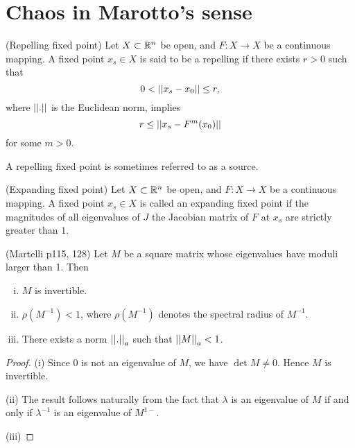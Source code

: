 \documentclass[12pt,draft,twoside]{book}
\begin{document}
\section{Chaos in Marotto's sense}
\citep{marotto1,marotto2} 

\begin{definition}
  (Repelling fixed point)
  Let $X \subset \mathbb{R}^n$ be open, and $F: X \to X$ be a continuous mapping. 
  A fixed point $x_s \in X$ is said to be a repelling if there exists $r > 0$
  such that 
  \begin{equation*}
    0 < \left|\left| x_s - x_0 \right|\right| \leq r,
  \end{equation*}
  where $\left|\left| . \right|\right|$ is the Euclidean norm, implies
\begin{equation*}
  r \leq \left|\left| x_s - F^m(x_0) \right|\right|
\end{equation*}
for some $m > 0$.
\end{definition}
A repelling fixed point is sometimes referred to as a source.

\begin{definition}
  (Expanding fixed point)
  Let $X \subset \mathbb{R}^n$ be open, and $F: X \to X$ be a continuous mapping. 
  A fixed point $x_s \in  X$ is called an expanding fixed point if
  the magnitudes of all eigenvalues of $J$ the Jacobian matrix of $F$ at $x_s$ are strictly greater than $1$.
\end{definition}

\begin{lemma}
  (Martelli p115, 128)
  Let $M$ be a square matrix whose eigenvalues have moduli larger than 1.
  Then 
  \begin{enumerate}[(i)]
    \item $M$ is invertible.
    \item $\rho(M^{-1}) < 1$, where $\rho(M^{-1})$ denotes the spectral radius of $M^{-1}$.
    \item There exists a norm $\left|\left| . \right|\right|_a$ such that $\left|\left| M \right|\right|_a < 1$.
  \end{enumerate}
\end{lemma}
\begin{proof}
  (i) Since $0$ is not an eigenvalue of $M$, we have $\det M \neq 0$.
  Hence $M$ is invertible.

  (ii) The result follows naturally from the fact that
  $\lambda$ is an eigenvalue of $M$ if and only if $\lambda^{-1}$ is an eigenvalue of $M^{1-}$.

  (iii) 
\end{proof}
\end{document}
